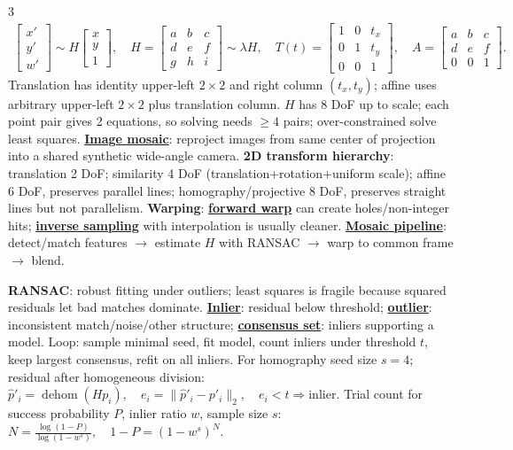 \documentclass{article}
\numberwithin{equation}{subsection}
\newcommand{\key}[1]{\textbf{#1}}
\newcommand{\lowterm}[1]{\textbf{\underline{#1}}}
\begin{document}
\begin{multicols*}{3}
\(
\begin{gathered}
\begin{bmatrix}x'\\y'\\w'\end{bmatrix}\sim
H\begin{bmatrix}x\\y\\1\end{bmatrix},\quad
H=\begin{bmatrix}a&b&c\\d&e&f\\g&h&i\end{bmatrix}\sim\lambda H,\quad
T(t)=\begin{bmatrix}1&0&t_x\\0&1&t_y\\0&0&1\end{bmatrix},\quad
A=\begin{bmatrix}a&b&c\\d&e&f\\0&0&1\end{bmatrix}.
\end{gathered}
\)
Translation has identity upper-left $2\times2$ and right column $(t_x,t_y)$; affine uses arbitrary upper-left $2\times2$ plus translation column. $H$ has 8 DoF up to scale; each point pair gives 2 equations, so solving needs $\ge4$ pairs; over-constrained solve least squares. \lowterm{Image mosaic}: reproject images from same center of projection into a shared synthetic wide-angle camera.
\key{2D transform hierarchy}: translation 2 DoF; similarity 4 DoF (translation+rotation+uniform scale); affine 6 DoF, preserves parallel lines; homography/projective 8 DoF, preserves straight lines but not parallelism. \key{Warping}: \lowterm{forward warp} can create holes/non-integer hits; \lowterm{inverse sampling} with interpolation is usually cleaner. \lowterm{Mosaic pipeline}: detect/match features $\to$ estimate $H$ with RANSAC $\to$ warp to common frame $\to$ blend.

\key{RANSAC}: robust fitting under outliers; least squares is fragile because squared residuals let bad matches dominate. \lowterm{Inlier}: residual below threshold; \lowterm{outlier}: inconsistent match/noise/other structure; \lowterm{consensus set}: inliers supporting a model. Loop: sample minimal seed, fit model, count inliers under threshold $t$, keep largest consensus, refit on all inliers. For homography seed size $s=4$; residual after homogeneous division:
\(
\hat p'_i=\operatorname{dehom}(Hp_i),\quad e_i=\|\hat p'_i-p'_i\|_2,\quad e_i<t\Rightarrow\text{inlier}.
\)
Trial count for success probability $P$, inlier ratio $w$, sample size $s$:
\(
N=\frac{\log(1-P)}{\log(1-w^s)},\quad 1-P=(1-w^s)^N .
\)


\end{multicols*}
\end{document}
